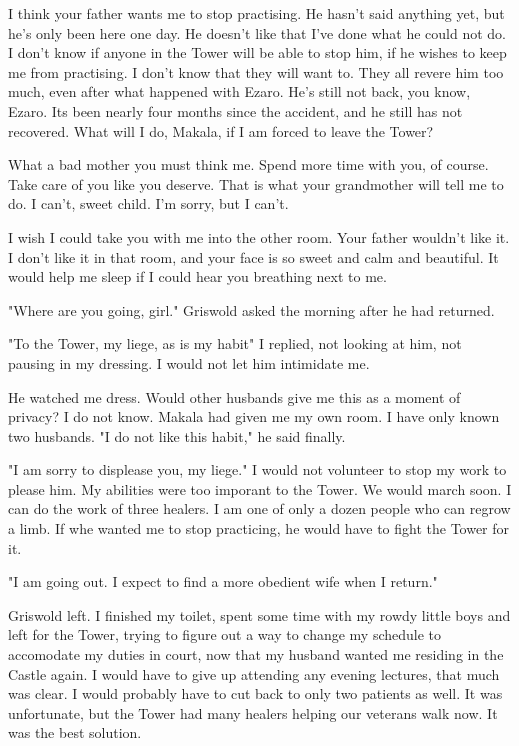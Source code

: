 \documentclass{article}
\begin{document}
I think your father wants me to stop practising. He hasn't said anything yet, but he's only been here one day. He doesn't like that I've done what he could not do. I don't know if anyone in the Tower will be able to stop him, if he wishes to keep me from practising. I don't know that they will want to. They all revere him too much, even after what happened with Ezaro. He's still not back, you know, Ezaro. Its been nearly four months since the accident, and he still has not recovered. What will I do, Makala, if I am forced to leave the Tower?

What a bad mother you must think me. Spend more time with you, of course. Take care of you like you deserve. That is what your grandmother will tell me to do. I can't, sweet child. I'm sorry, but I can't.

I wish I could take you with me into the other room. Your father wouldn't like it. I don't like it in that room, and your face is so sweet and calm and beautiful. It would help me sleep if I could hear you breathing next to me.

\vspace{.5cm}

"Where are you going, girl."  Griswold asked the morning after he had returned.

"To the Tower, my liege, as is my habit" I replied, not looking at him, not pausing in my dressing. I would not let him intimidate me.

He watched me dress. Would other husbands give me this as a moment of privacy? I do not know. Makala had given me my own room. I have only known two husbands. "I do not like this habit," he said finally.

"I am sorry to displease you, my liege." I would not volunteer to stop my work to please him. My abilities were too imporant to the Tower. We would march soon. I can do the work of three healers. I am one of only a dozen people who can regrow a limb. If whe wanted me to stop practicing, he would have to fight the Tower for it.

"I am going out. I expect to find a more obedient wife when I return."

Griswold left. I finished my toilet, spent some time with my rowdy little boys and left for the Tower, trying to figure out a way to change my schedule to accomodate my duties in court, now that my husband wanted me residing in the Castle again. I would have to give up attending any evening lectures, that much was clear. I would probably have to cut back to only two patients as well. It was unfortunate, but the Tower had many healers helping our veterans walk now. It was the best solution.
\end{document}
